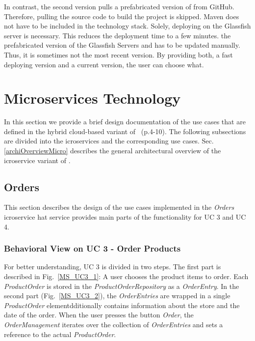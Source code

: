In contrast, the second version pulls a prefabricated version of \CoCoME from GitHub. 
Therefore, pulling the source code to build the \CoCoME project is skipped. 
Maven does not have to be included in the technology stack. 
Solely, deploying \CoCoME on the Glassfish server is necessary.
This reduces the deployment time to a few minutes.
 the prefabricated version of the Glassfish Servers and \CoCoME has to be updated manually. 
Thus, it is sometimes not the most recent version.
By providing both, a fast deploying version and a current version, the user can choose what.
	

	

	
\section{Microservices Technology} \label{MS}
In this section we provide a brief design documentation of the use cases that are defined in the hybrid cloud-based variant of \CoCoME~\cite{herold2008}(p.4-10).
The following subsections are divided into the icroservices and the corresponding use cases. 
Sec.\ref{archiOverviewMicro} describes the general architectural overview of the icroservice variant of \CoCoME.
	

	

	\FloatBarrier
		\subsection{Orders}
		This section describes the design of the use cases implemented in the \textit{Orders} icroservice
		hat service provides main parts of the functionality for UC 3 and UC 4.

		\subsubsection*{Behavioral View on UC 3 - Order Products} 
		For  better understanding, UC 3 is divided in two steps. The first part is described in Fig.~\ref{MS_UC3_1}: A user chooses the product items to order. Each \textit{ProductOrder} is stored in the \textit{ProductOrderRepository} as a \textit{OrderEntry}. In the second part (Fig.~\ref{MS_UC3_2}), the \textit{OrderEntries} are wrapped in a single \textit{ProductOrder} elementdditionally contains information about the store and the date of the order. When the user presses the button \textit{Order}, the \textit{OrderManagement} iterates over the collection of \textit{OrderEntries} and sets a reference to the actual \textit{ProductOrder}.
	

